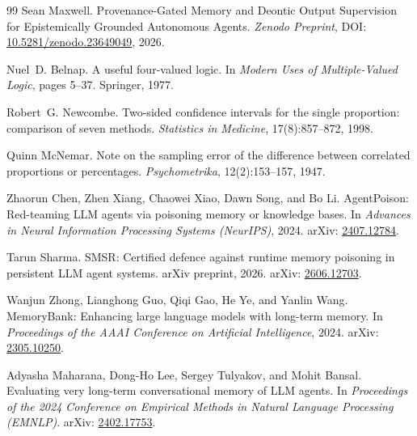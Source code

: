 \documentclass[11pt,a4paper]{article}
\begin{document}

\begin{thebibliography}{99}
Sean Maxwell.
\newblock Provenance-Gated Memory and Deontic Output Supervision for Epistemically Grounded Autonomous Agents.
\newblock \emph{Zenodo Preprint}, DOI: \href{https://doi.org/10.5281/zenodo.23649049}{10.5281/zenodo.23649049}, 2026.

Nuel~D. Belnap.
\newblock A useful four-valued logic.
\newblock In \emph{Modern Uses of Multiple-Valued Logic}, pages 5--37. Springer, 1977.

Robert~G. Newcombe.
\newblock Two-sided confidence intervals for the single proportion: comparison of seven methods.
\newblock \emph{Statistics in Medicine}, 17(8):857--872, 1998.

Quinn McNemar.
\newblock Note on the sampling error of the difference between correlated proportions or percentages.
\newblock \emph{Psychometrika}, 12(2):153--157, 1947.

Zhaorun Chen, Zhen Xiang, Chaowei Xiao, Dawn Song, and Bo Li.
\newblock AgentPoison: Red-teaming LLM agents via poisoning memory or knowledge bases.
\newblock In \emph{Advances in Neural Information Processing Systems (NeurIPS)}, 2024. arXiv: \href{https://arxiv.org/abs/2407.12784}{2407.12784}.

Tarun Sharma.
\newblock SMSR: Certified defence against runtime memory poisoning in persistent LLM agent systems.
\newblock arXiv preprint, 2026. arXiv: \href{https://arxiv.org/abs/2606.12703}{2606.12703}.

Wanjun Zhong, Lianghong Guo, Qiqi Gao, He Ye, and Yanlin Wang.
\newblock MemoryBank: Enhancing large language models with long-term memory.
\newblock In \emph{Proceedings of the AAAI Conference on Artificial Intelligence}, 2024. arXiv: \href{https://arxiv.org/abs/2305.10250}{2305.10250}.

Adyasha Maharana, Dong-Ho Lee, Sergey Tulyakov, and Mohit Bansal.
\newblock Evaluating very long-term conversational memory of LLM agents.
\newblock In \emph{Proceedings of the 2024 Conference on Empirical Methods in Natural Language Processing (EMNLP)}. arXiv: \href{https://arxiv.org/abs/2402.17753}{2402.17753}.
\end{thebibliography}
\end{document}
